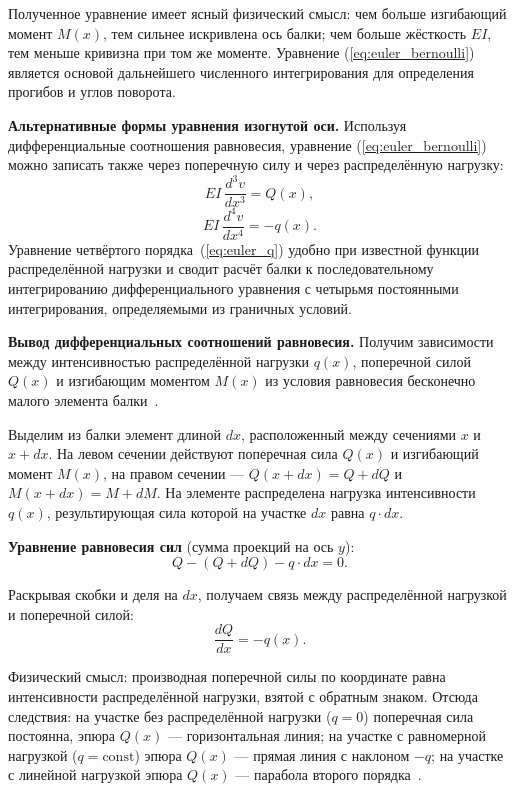 Полученное уравнение имеет ясный физический смысл: чем больше изгибающий момент $M(x)$, тем сильнее искривлена ось балки; чем больше жёсткость $EI$, тем меньше кривизна при том же моменте. Уравнение (\ref{eq:euler_bernoulli}) является основой дальнейшего численного интегрирования для определения прогибов и углов поворота.

\textbf{Альтернативные формы уравнения изогнутой оси.} Используя дифференциальные соотношения равновесия, уравнение (\ref{eq:euler_bernoulli}) можно записать также через поперечную силу и через распределённую нагрузку:
\begin{equation}
  E I \, \frac{d^3 v}{dx^3} = Q(x),
  \label{eq:euler_Q}
\end{equation}
\begin{equation}
  E I \, \frac{d^4 v}{dx^4} = -q(x).
  \label{eq:euler_q}
\end{equation}
Уравнение четвёртого порядка~(\ref{eq:euler_q}) удобно при известной функции распределённой нагрузки и сводит расчёт балки к последовательному интегрированию дифференциального уравнения с четырьмя постоянными интегрирования, определяемыми из граничных условий.

\textbf{Вывод дифференциальных соотношений равновесия.} Получим зависимости между интенсивностью распределённой нагрузки $q(x)$, поперечной силой $Q(x)$ и изгибающим моментом $M(x)$ из условия равновесия бесконечно малого элемента балки~\cite{feodosev, belyaev, darkov}.

Выделим из балки элемент длиной $dx$, расположенный между сечениями $x$ и $x + dx$. На левом сечении действуют поперечная сила $Q(x)$ и изгибающий момент $M(x)$, на правом сечении --- $Q(x + dx) = Q + dQ$ и $M(x + dx) = M + dM$. На элементе распределена нагрузка интенсивности $q(x)$, результирующая сила которой на участке $dx$ равна $q \cdot dx$.

\textbf{Уравнение равновесия сил} (сумма проекций на ось $y$):
\begin{equation}
  Q - (Q + dQ) - q \cdot dx = 0.
  \label{eq:eq_force_deriv}
\end{equation}

Раскрывая скобки и деля на $dx$, получаем связь между распределённой нагрузкой и поперечной силой:
\begin{equation}
  \frac{dQ}{dx} = -q(x).
  \label{eq:shear_load_relation}
\end{equation}

Физический смысл: производная поперечной силы по координате равна интенсивности распределённой нагрузки, взятой с обратным знаком. Отсюда следствия: на участке без распределённой нагрузки ($q = 0$) поперечная сила постоянна, эпюра $Q(x)$ --- горизонтальная линия; на участке с равномерной нагрузкой ($q = \text{const}$) эпюра $Q(x)$ --- прямая линия с наклоном $-q$; на участке с линейной нагрузкой эпюра $Q(x)$ --- парабола второго порядка~\cite{feodosev}.

